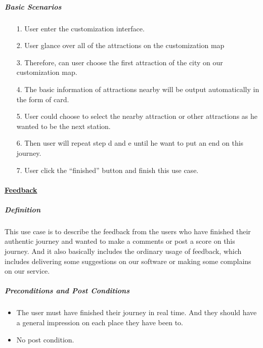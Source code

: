 \documentclass[10pt]{article}
\begin{document}
\begin{itemize}
		\subparagraph{Basic Scenarios} 
		\begin{itemize}
			\item[1.]	User enter the customization interface.
			\item[2.]	User glance over all of the attractions on the customization map
			\item[3.]	Therefore,  can user choose the first attraction of the city on our customization map.
			\item[4.] The basic information of attractions nearby will be output automatically in the form of card.
			\item[5.]User could choose to select the nearby attraction or other attractions as he wanted to be the next station.
			\item[6.] Then user will repeat step d and e until he want to put an end on this journey.
			\item[7.]User click the “finished” button and finish this use case.
			
		\end{itemize}

		\paragraph{\underline{Feedback}}

		\subparagraph{Definition}
		This use case is to describe the feedback from the users who have finished their authentic journey and wanted to make a comments or post a score on this journey. And it also basically includes the ordinary usage of feedback, which includes delivering some suggestions on our software or making some complains on our service.

		\subparagraph{Preconditions and Post Conditions}
		\begin{itemize}
			\item The user must have finished their journey in real time. And they should have a general impression on each place they have been to. 
			\item No post condition.
		\end{itemize}


\end{itemize}
\end{document}
